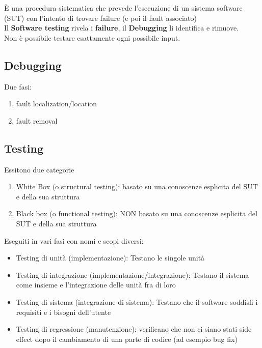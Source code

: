 \`E una procedura sistematica che prevede l’esecuzione di un sistema software (SUT) con l’intento di trovare failure (e poi il fault associato)\\
Il \textbf{Software testing} rivela i \textbf{failure}, il \textbf{Debugging} li identifica e rimuove.\\
Non \`e possibile testare esattamente ogni possibile input.

\subsection{Debugging}
Due fasi:
\begin{enumerate}
    \item fault localization/location
    \item fault removal
\end{enumerate}

\subsection{Testing}
Essitono due categorie
\begin{enumerate}
    \item White Box (o structural testing): basato su una conoscenze esplicita del SUT e della sua struttura
    \item Black box (o functional testing): NON basato su una conoscenze esplicita del SUT e della sua struttura
\end{enumerate}

\noindent Eseguiti in vari fasi con nomi e scopi diversi:
\begin{itemize}
    \item Testing di unità (implementazione): Testano le singole unità
    \item Testing di integrazione (implementazione/integrazione): Testano il sistema come insieme e l'integrazione delle unità fra di loro
    \item Testing di sistema (integrazione di sistema): Testano che il software soddisfi i requisiti e i bisogni dell'utente
    \item Testing di regressione (manutenzione): verificano che non ci siano stati side effect dopo il cambiamento di una parte di codice (ad esempio bug fix)
\end{itemize}